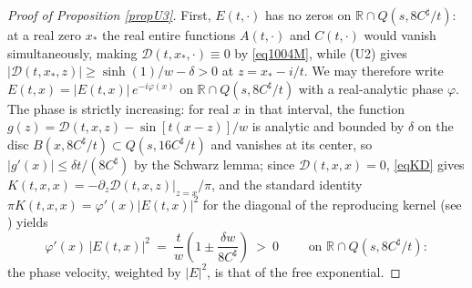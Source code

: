 \documentclass[11pt,twoside,reqno]{amsart}
\def\pa{\partial}
\def\R{{\mathbb R}}
\def\d{\delta}
\theoremstyle{plain}
\numberwithin{equation}{section}
\begin{document}
\begin{proof}[Proof of Proposition \ref{propU3}]
First, $E(t,\cdot)$ has no zeros on $\R\cap Q(s,8C^\sharp/t)$: at a real zero $x_*$ the real entire functions $A(t,\cdot)$ and $C(t,\cdot)$ would vanish simultaneously, making ${\mathcal D}(t,x_*,\cdot)\equiv0$ by \eqref{eq1004M}, while (U2) gives $|{\mathcal D}(t,x_*,z)|\geq\sinh(1)/w-\d>0$ at $z=x_*-i/t$. We may therefore write $E(t,x)=|E(t,x)|\,e^{-i\varphi(x)}$ on $\R\cap Q(s,8C^\sharp/t)$ with a real-analytic phase $\varphi$. The phase is strictly increasing: for real $x$ in that interval, the function $g(z)={\mathcal D}(t,x,z)-\sin[t(x-z)]/w$ is analytic and bounded by $\d$ on the disc $B(x,8C^\sharp/t)\subset Q(s,16C^\sharp/t)$ and vanishes at its center, so $|g'(x)|\leq\d t/(8C^\sharp)$ by the Schwarz lemma; since ${\mathcal D}(t,x,x)=0$, \eqref{eqKD} gives $K(t,x,x)=-\pa_z{\mathcal D}(t,x,z)|_{z=x}/\pi$, and the standard identity $\pi K(t,x,x)=\varphi'(x)|E(t,x)|^2$ for the diagonal of the reproducing kernel (see \cite{dBr}) yields
\begin{equation}
\varphi'(x)\,|E(t,x)|^{2}\ =\ \frac tw\left(1\pm\frac{\d w}{8C^\sharp}\right)\ >\ 0
\qquad\text{ on }\R\cap Q(s,8C^\sharp/t):
\label{eqPhaseVel}
\end{equation}
the phase velocity, weighted by $|E|^2$, is that of the free exponential.


\end{proof}
\end{document}

